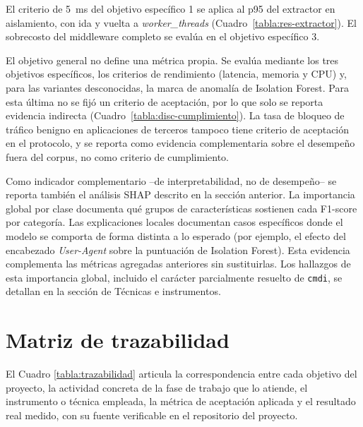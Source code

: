 El criterio de 5~ms del objetivo específico 1 se aplica al p95 del extractor en aislamiento, con ida y vuelta a \textit{worker\_threads} (Cuadro~\ref{tabla:res-extractor}). El sobrecosto del middleware completo se evalúa en el objetivo específico 3.

El objetivo general no define una métrica propia. Se evalúa mediante los tres objetivos específicos, los criterios de rendimiento (latencia, memoria y CPU) y, para las variantes desconocidas, la marca de anomalía de Isolation Forest. Para esta última no se fijó un criterio de aceptación, por lo que solo se reporta evidencia indirecta (Cuadro~\ref{tabla:disc-cumplimiento}). La tasa de bloqueo de tráfico benigno en aplicaciones de terceros tampoco tiene criterio de aceptación en el protocolo, y se reporta como evidencia complementaria sobre el desempeño fuera del corpus, no como criterio de cumplimiento.

Como indicador complementario --de interpretabilidad, no de desempeño-- se reporta también el análisis SHAP descrito en la sección anterior. La importancia global por clase documenta qué grupos de características sostienen cada F1-score por categoría. Las explicaciones locales documentan casos específicos donde el modelo se comporta de forma distinta a lo esperado (por ejemplo, el efecto del encabezado \textit{User-Agent} sobre la puntuación de Isolation Forest). Esta evidencia complementa las métricas agregadas anteriores sin sustituirlas. Los hallazgos de esta importancia global, incluido el carácter parcialmente resuelto de \texttt{cmdi}, se detallan en la sección de Técnicas e instrumentos.

\section{Matriz de trazabilidad}

El Cuadro \ref{tabla:trazabilidad} articula la correspondencia entre cada objetivo del proyecto, la actividad concreta de la fase de trabajo que lo atiende, el instrumento o técnica empleada, la métrica de aceptación aplicada y el resultado real medido, con su fuente verificable en el repositorio del proyecto.

